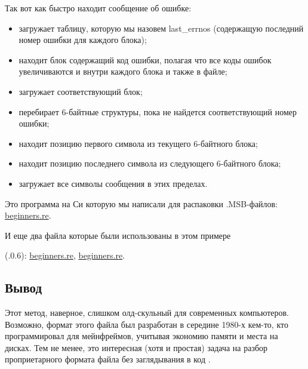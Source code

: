 Так вот как \oracle быстро находит сообщение об ошибке:

\begin{itemize}
\item загружает таблицу, которую мы назовем last\_errnos 
(содержащую последний номер ошибки для каждого блока);

\item находит блок содержащий код ошибки, полагая что все коды ошибок увеличиваются и внутри каждого блока
и также в файле;

\item загружает соответствующий блок;

\item перебирает 6-байтные структуры, пока не найдется соответствующий номер ошибки;

\item находит позицию первого символа из текущего 6-байтного блока;

\item находит позицию последнего символа из следующего 6-байтного блока;

\item загружает все символы сообщения в этих пределах.
\end{itemize}

Это программа на Си которую мы написали для распаковки .MSB-файлов:
\href{http://go.yurichev.com/17213}{beginners.re}.

И еще два файла которые были использованы в этом примере
 
(.0.6):
\href{http://go.yurichev.com/17214}{beginners.re},
\href{http://go.yurichev.com/17215}{beginners.re}.

\subsection{Вывод}

Этот метод, наверное, слишком олд-скульный для современных компьютеров.
Возможно, формат этого файла был разработан в середине 1980-х кем-то, кто программировал для мейнфреймов,
учитывая экономию памяти и места на дисках.
Тем не менее, это интересная (хотя и простая) задача на разбор проприетарного формата файла без
заглядывания в код \oracle.
